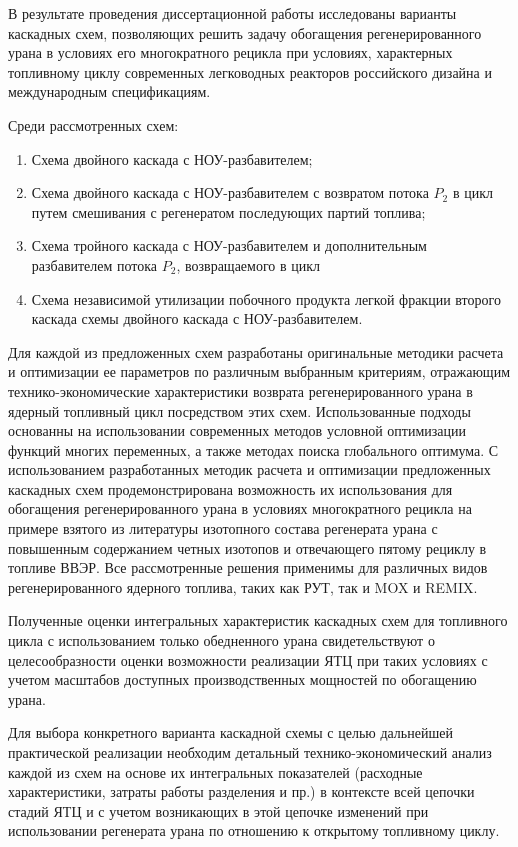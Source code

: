 В результате проведения диссертационной работы исследованы варианты каскадных схем, позволяющих решить задачу обогащения регенерированного урана в условиях его многократного рецикла при условиях, характерных топливному циклу современных легководных реакторов российского дизайна и международным спецификациям.

Среди рассмотренных схем:
\begin{enumerate}
  \item Схема двойного каскада с НОУ-разбавителем;
  \item Схема двойного каскада с НОУ-разбавителем с возвратом потока $P_2$ в цикл путем смешивания с регенератом последующих партий топлива;
  \item Схема тройного каскада с НОУ-разбавителем и дополнительным разбавителем потока $P_2$, возвращаемого в цикл
  \item Схема независимой утилизации побочного продукта легкой фракции второго каскада схемы двойного каскада с НОУ-разбавителем.
\end{enumerate}


Для каждой из предложенных схем разработаны оригинальные методики расчета и оптимизации ее параметров по различным выбранным критериям,  отражающим технико-экономические характеристики возврата регенерированного урана в ядерный топливный цикл посредством этих схем. Использованные подходы основанны на использовании современных методов условной оптимизации функций многих переменных, а также методах поиска глобального оптимума. С использованием разработанных методик расчета и оптимизации предложенных каскадных схем продемонстрирована возможность их использования для обогащения регенерированного урана в условиях многократного рецикла на примере взятого из литературы изотопного состава регенерата урана с повышенным содержанием четных изотопов и отвечающего пятому рециклу в топливе ВВЭР. Все рассмотренные решения применимы для различных видов регенерированного ядерного топлива, таких как РУТ, так и MOX и REMIX.

Полученные оценки интегральных характеристик каскадных схем для топливного цикла с использованием только обедненного урана свидетельствуют о целесообразности оценки возможности реализации ЯТЦ при таких условиях с учетом масштабов доступных производственных мощностей по обогащению урана.

Для выбора конкретного варианта каскадной схемы с целью дальнейшей практической реализации необходим детальный технико-экономический анализ каждой из схем на основе их интегральных показателей (расходные характеристики, затраты работы разделения и пр.) в контексте всей цепочки стадий ЯТЦ и с учетом возникающих в этой цепочке изменений при использовании регенерата урана по отношению к открытому топливному циклу. 

